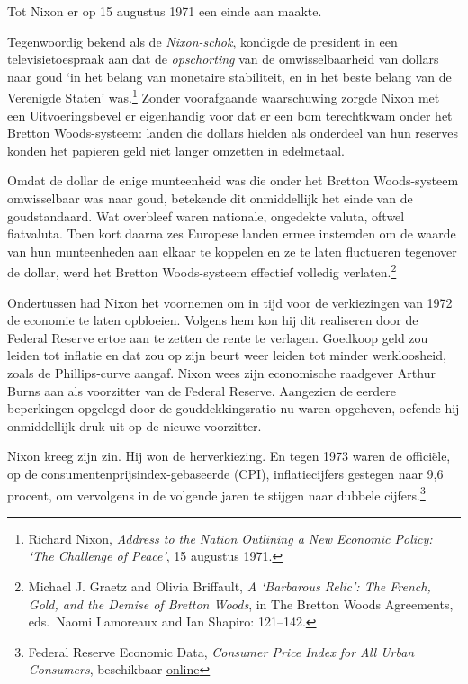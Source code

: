 \documentclass[
  a5paper,
  smalldemyvopaper,11pt,twoside,onecolumn,openright,extrafontsizes,
hidelinks]{memoir}
\begin{document}
Tot Nixon er op 15 augustus 1971 een einde aan maakte.

Tegenwoordig bekend als de \emph{Nixon-schok}, kondigde de president in
een televisietoespraak aan dat de \emph{opschorting} van de
omwisselbaarheid van dollars naar goud `in het belang van monetaire
stabiliteit, en in het beste belang van de Verenigde Staten'
was.\footnote{\hspace{0pt}Richard Nixon, \emph{Address to the Nation
  Outlining a New Economic Policy: `The Challenge of Peace'}, 15
  augustus 1971.} Zonder voorafgaande waarschuwing zorgde Nixon met een
Uitvoeringsbevel er eigenhandig voor dat er een bom terechtkwam onder
het Bretton Woods-systeem: landen die dollars hielden als onderdeel van
hun reserves konden het papieren geld niet langer omzetten in
edelmetaal.

Omdat de dollar de enige munteenheid was die onder het Bretton
Woods-systeem omwisselbaar was naar goud, betekende dit onmiddellijk het
einde van de goudstandaard. Wat overbleef waren nationale, ongedekte
valuta, oftwel fiatvaluta. Toen kort daarna zes Europese landen ermee
instemden om de waarde van hun munteenheden aan elkaar te koppelen en ze
te laten fluctueren tegenover de dollar, werd het Bretton Woods-systeem
effectief volledig verlaten.\footnote{\hspace{0pt}Michael J. Graetz and
  Olivia Briffault, \emph{A `Barbarous Relic': The French, Gold, and the
  Demise of Bretton Woods}, in The Bretton Woods Agreements, eds.~Naomi
  Lamoreaux and Ian Shapiro: 121--142.}

Ondertussen had Nixon het voornemen om in tijd voor de verkiezingen van
1972 de economie te laten opbloeien. Volgens hem kon hij dit realiseren
door de Federal Reserve ertoe aan te zetten de rente te verlagen.
Goedkoop geld zou leiden tot inflatie en dat zou op zijn beurt weer
leiden tot minder werkloosheid, zoals de Phillips-curve aangaf. Nixon
wees zijn economische raadgever Arthur Burns aan als voorzitter van de
Federal Reserve. Aangezien de eerdere beperkingen opgelegd door de
gouddekkingsratio nu waren opgeheven, oefende hij onmiddellijk druk uit
op de nieuwe voorzitter.

Nixon kreeg zijn zin. Hij won de herverkiezing. En tegen 1973 waren de
officiële, op de consumentenprijsindex-gebaseerde (CPI), inflatiecijfers
gestegen naar 9,6 procent, om vervolgens in de volgende jaren te stijgen
naar dubbele cijfers.\footnote{Federal Reserve Economic Data,
  \emph{Consumer Price Index for All Urban Consumers}, beschikbaar
  \href{https://fred.stlouisfed.org/series/CPIAUCSL}{online}}
\end{document}
